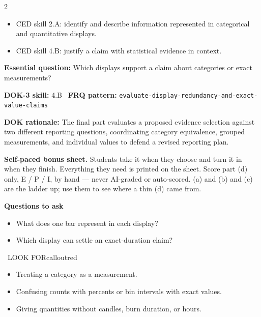 \documentclass[11pt]{article}
\begin{document}

\begin{multicols}{2}
{\footnotesize\setlength{\parskip}{0pt}
\begin{itemize}[leftmargin=*,itemsep=0pt,topsep=0pt]
\item CED skill 2.A: identify and describe information represented in categorical and quantitative displays.
\item CED skill 4.B: justify a claim with statistical evidence in context.
\end{itemize}}
\end{multicols}
\clearpage
\small
\textbf{Essential question:} Which displays support a claim about categories or exact measurements?\par
\textbf{DOK-3 skill:} 4.B \textperiodcentered\ \textbf{FRQ pattern:} {\small\texttt{evaluate-\allowbreak{}display-\allowbreak{}redundancy-\allowbreak{}and-\allowbreak{}exact-\allowbreak{}value-\allowbreak{}claims}}\par
\textbf{DOK rationale:} The final part evaluates a proposed evidence selection against two different reporting questions, coordinating category equivalence, grouped measurements, and individual values to defend a revised reporting plan.\par

\textbf{Self-paced bonus sheet.} Students take it when they choose and turn it in when they finish. Everything they need is printed on the sheet. Score part (d) only, E / P / I, by hand --- never AI-graded or auto-scored. (a) and (b) and (c) are the ladder up; use them to see where a thin (d) came from.\par

\textbf{Questions to ask}
\begin{itemize}[leftmargin=1.5em,itemsep=2pt,topsep=2pt]
  \item What does one bar represent in each display?
  \item Which display can settle an exact-duration claim?
\end{itemize}

\begin{callout}{\IconWarn\ LOOK FOR}{calloutred}
\begin{itemize}[leftmargin=1.5em,itemsep=2pt,topsep=2pt]
  \item Treating a category as a measurement.
  \item Confusing counts with percents or bin intervals with exact values.
  \item Giving quantities without candles, burn duration, or hours.
\end{itemize}
\end{callout}
\end{document}
